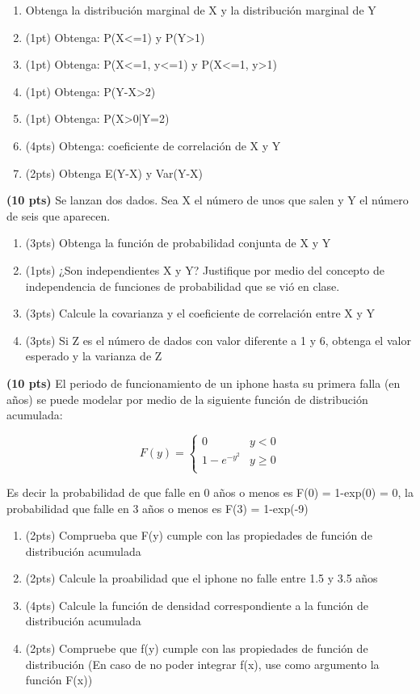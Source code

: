 \documentclass[addpoints]{exam}
\theoremstyle{mytheor}
\begin{document}
\begin{questions}
\begin{enumerate}[label=\Alph*)]
\item Obtenga la distribución marginal de X y la distribución marginal de Y
\item (1pt) Obtenga: P(X<=1) y P(Y>1)
\item (1pt) Obtenga: P(X<=1, y<=1) y P(X<=1, y>1)
\item (1pt) Obtenga: P(Y-X>2)
\item (1pt) Obtenga: P(X>0|Y=2)
\item (4pts) Obtenga: coeficiente de correlación de X y Y
\item (2pts) Obtenga E(Y-X) y Var(Y-X)
\end{enumerate}

\question \textbf{(10 pts)}
Se lanzan dos dados. Sea X el número de unos que salen y Y el número de seis que aparecen.
\begin{enumerate}[label=\Alph*)]
\item (3pts) Obtenga la función de probabilidad conjunta de X y Y
\item (1pts) ¿Son independientes X y Y? Justifique por medio del concepto de independencia de funciones de probabilidad que se vió en clase.  
\item (3pts) Calcule la covarianza y el coeficiente de correlación entre X y Y
\item (3pts) Si Z es el número de dados con valor diferente a 1 y 6, obtenga el valor esperado y la varianza de Z
\end{enumerate}

\question \textbf{(10 pts)}
El periodo de funcionamiento de un iphone hasta su primera falla (en años) se puede modelar por medio de la siguiente función de distribución acumulada:

\[   
F(y) = 
     \begin{cases}
       0 & y<0\\
      1-e^{-y^2} & y \geq 0 \\
     \end{cases}
\]

Es decir la probabilidad de que falle en 0 años o menos es F(0) = 1-exp(0) = 0, la probabilidad que falle en 3 años o menos es F(3) = 1-exp(-9)

\begin{enumerate}[label=\Alph*)]
\item (2pts) Comprueba que F(y) cumple con las propiedades de función de distribución acumulada
\item (2pts) Calcule la proabilidad que el iphone no falle entre 1.5 y 3.5 años
\item (4pts) Calcule la función de densidad correspondiente a la función de distribución acumulada
\item (2pts) Compruebe que f(y) cumple con las propiedades de función de distribución (En caso de no poder integrar f(x), use como argumento la función F(x))
\end{enumerate}


\end{questions} 
\end{document}
